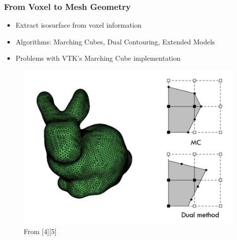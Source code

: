 \begin{frame}

	\frametitle{From Voxel to Mesh Geometry}
	
	\begin{itemize}
	\item Extract isosurface from voxel information
	\item Algorithms: Marching Cubes, Dual Contouring, Extended Models
	\item Problems with VTK's Marching Cube implementation
	\end{itemize}
	\begin{figure}
	\includegraphics[scale=0.35]{Pictures/bunny_MC.pdf}
	\caption{From [4][5]}
	\end{figure}
	
\end{frame}



